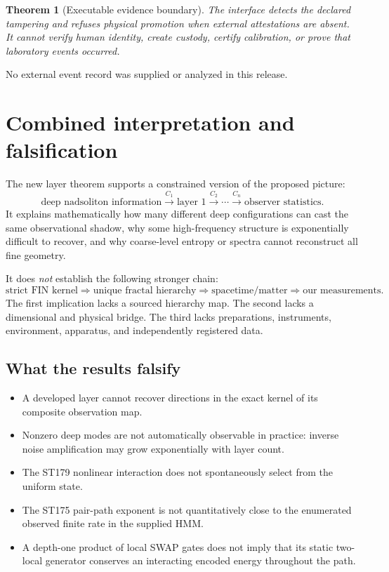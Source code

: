 \documentclass[11pt,a4paper]{article}
\newtheorem{theorem}{Theorem}[section]
\begin{document}
\begin{theorem}[Executable evidence boundary]
The interface detects the declared tampering and refuses physical promotion when external attestations are absent. It cannot verify human identity, create custody, certify calibration, or prove that laboratory events occurred.
\end{theorem}

No external event record was supplied or analyzed in this release.

\section{Combined interpretation and falsification}

The new layer theorem supports a constrained version of the proposed picture:
\[
\text{deep nadsoliton information}
\xrightarrow{C_1}\text{layer 1}
\xrightarrow{C_2}\cdots
\xrightarrow{C_n}\text{observer statistics}.
\]
It explains mathematically how many different deep configurations can cast the same observational shadow, why some high-frequency structure is exponentially difficult to recover, and why coarse-level entropy or spectra cannot reconstruct all fine geometry.

It does \emph{not} establish the following stronger chain:
\[
\text{strict FIN kernel}\Longrightarrow
\text{unique fractal hierarchy}\Longrightarrow
\text{spacetime/matter}\Longrightarrow
\text{our measurements}.
\]
The first implication lacks a sourced hierarchy map. The second lacks a dimensional and physical bridge. The third lacks preparations, instruments, environment, apparatus, and independently registered data.

\subsection{What the results falsify}

\begin{itemize}
\item A developed layer cannot recover directions in the exact kernel of its composite observation map.
\item Nonzero deep modes are not automatically observable in practice: inverse noise amplification may grow exponentially with layer count.
\item The ST179 nonlinear interaction does not spontaneously select from the uniform state.
\item The ST175 pair-path exponent is not quantitatively close to the enumerated observed finite rate in the supplied HMM.
\item A depth-one product of local SWAP gates does not imply that its static two-local generator conserves an interacting encoded energy throughout the path.
\end{itemize}
\end{document}
